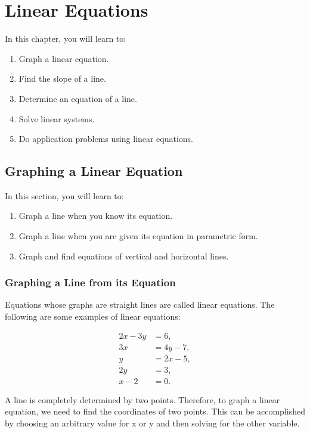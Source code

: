 \chapter{Linear Equations} %

In this chapter, you will learn to:

\begin{enumerate}
    \item Graph a linear equation.
    \item Find the slope of a line.
    \item Determine an equation of a line.
    \item Solve linear systems.
    \item Do application problems using linear equations.
\end{enumerate}

\section{Graphing a Linear Equation}

In this section, you will learn to:

\begin{enumerate}
    \item Graph a line when you know its equation.
    \item Graph a line when you are given its equation in parametric form.
    \item Graph and find equations of vertical and horizontal lines.
\end{enumerate}

\subsection{Graphing a Line from its Equation}

Equations whose graphs are straight lines are called linear equations. The following are some examples of linear equations:

\begin{align*}
2x - 3y &= 6, \\
3x &= 4y - 7, \\
y &= 2x - 5, \\
2y &= 3, \\
x - 2 &= 0.
\end{align*}

A line is completely determined by two points. Therefore, to graph a linear equation, we need to find the coordinates of two points. This can be accomplished by choosing an arbitrary value for x or y and then solving for the other variable.


